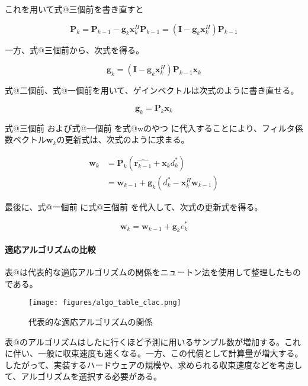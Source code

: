 これを用いて式@三個前を書き直すと


\begin{equation}
\bm{P}_k = \bm{P}_{k-1} - \bm{g}_k \bm{x}_k^H \bm{P}_{k-1} = (\bm{I} - \bm{g}_k \bm{x}_k^H) \bm{P}_{k-1}
\end{equation}

一方、式@三個前から、次式を得る。

\begin{equation}
\bm{g}_k = (\bm{I} - \bm{g}_k \bm{x}_k^H) \bm{P}_{k-1} \bm{x}_k
\end{equation}


式@二個前、式@一個前を用いて、ゲインベクトルは次式のように書き直せる。


\begin{equation}
\bm{g}_k = \bm{P}_k \bm{x}_k
\end{equation}


式@三個前 および式@一個前 を式@wのやつ
に代入することにより、フィルタ係数ベクトル\(\bm{w}_k\)の更新式は、次式のように求まる。

\begin{equation}
\begin{split}
\bm{w}_k &= \bm{P}_k (\hat{\bm{r}_{k-1}} + \bm{x}_k d_k^*) \\
         &= \bm{w}_{k-1} + \bm{g}_k (d_k^* - \bm{x}_k^H \bm{w}_{k-1})
\end{split}
\end{equation}


最後に、式@一個前 に式@三個前 を代入して、次式の更新式を得る。

\begin{equation}
\bm{w}_k = \bm{w}_{k-1} + \bm{g}_k e_k^*
\end{equation}


\paragraph{適応アルゴリズムの比較}\label{algo-compare}

表@は代表的な適応アルゴリズムの関係をニュートン法を使用して整理したものである。

\begin{figure}
\centering
\texttt{[image: figures/algo\_table\_clac.png]}
\caption{代表的な適応アルゴリズムの関係}
\label{algo_table_calc}
\end{figure}

表@のアルゴリズムはしたに行くほど予測に用いるサンプル数が増加する。これに伴い、一般に収束速度も速くなる。一方、この代償として計算量が増大する。したがって、実装するハードウェアの規模や、求められる収束速度などを考慮して、アルゴリズムを選択する必要がある。

